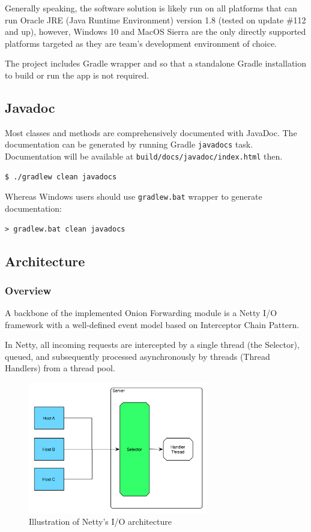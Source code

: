 \documentclass{article}
\begin{document}
Generally speaking, the software solution is likely run on all platforms that can run Oracle JRE (Java Runtime Environment) version 1.8 (tested on update \#112 and up), however, Windows 10 and MacOS Sierra are the only directly supported platforms targeted as they are team's development environment of choice.

The project includes Gradle wrapper and so that a standalone Gradle installation to build or run the app is not required.

\subsection{Javadoc}
Most classes and methods are comprehensively documented with JavaDoc. The documentation can be generated by running Gradle \verb|javadocs| task. Documentation will be available at \verb|build/docs/javadoc/index.html| then.
\begin{lstlisting}
$ ./gradlew clean javadocs
\end{lstlisting}

Whereas Windows users should use \verb|gradlew.bat| wrapper to generate documentation:
\begin{lstlisting}
> gradlew.bat clean javadocs
\end{lstlisting}

\subsection{Architecture}

\subsubsection{Overview}
A backbone of the implemented Onion Forwarding module is a Netty I/O framework with a well-defined event model based on Interceptor Chain Pattern.

In Netty, all incoming requests are intercepted by a single thread (the Selector), queued, and subsequently processed asynchronously by threads (Thread Handlers) from a thread pool.

\begin{figure}[H]
\centering
     \includegraphics[width=0.7\textwidth]{netty-req-quering.png}
      \caption{Illustration of Netty's I/O architecture \cite{netty}}
\end{figure}
\end{document}
